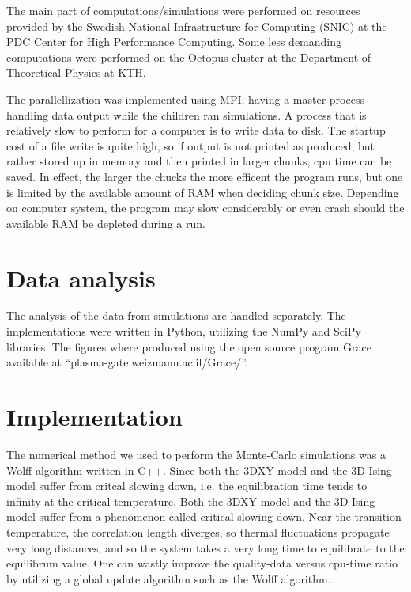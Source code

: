 The main part of computations/simulations were performed on resources provided by the Swedish National Infrastructure for Computing (SNIC) at the PDC Center for High Performance Computing.
Some less demanding computations were performed on the Octopus-cluster at the Department of Theoretical Physics at KTH.

The parallellization was implemented using MPI, having a master process handling data output while the children ran simulations.
A process that is relatively slow to perform for a computer is to write data to disk. 
The startup cost of a file write is quite high, so if output is not printed as produced, but rather stored up in memory and then printed in larger chunks, cpu time can be saved. 
In effect, the larger the chucks the more efficent the program runs, but one is limited by the available amount of RAM when deciding chunk size.
Depending on computer system, the program may slow considerably or even crash should the available RAM be depleted during a run.
\section{Data analysis}
The analysis of the data from simulations are handled separately.
The implementations were written in Python, utilizing the NumPy and SciPy libraries. 
The figures where produced using the open source program Grace available at ``plasma-gate.weizmann.ac.il/Grace/''.

\section{Implementation}
The numerical method we used to perform the Monte-Carlo simulations was a Wolff algorithm written in C++. Since both the 3DXY-model and the 3D Ising model suffer from critcal slowing down, i.e. the equilibration time tends to infinity at the critical temperature, 
Both the 3DXY-model and the 3D Ising-model suffer from a phenomenon called critical slowing down. Near the transition temperature, the correlation length diverges, so thermal fluctuations propagate very long distances, and so the system takes a very long time to equilibrate to the equilibrum value.
One can wastly improve the quality-data versus cpu-time ratio by utilizing a global update algorithm such as the Wolff algorithm. 
